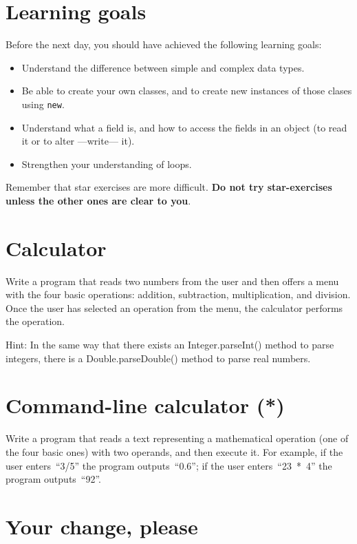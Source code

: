 \documentclass{article}
\begin{document}
\section*{Learning goals}
\label{sec:learning-goals}

Before the next day, you should have achieved the following learning
goals: 

\begin{itemize}
\item Understand the difference between simple and complex data types. 
\item Be able to create your own classes, and to create new instances
  of those clases using \verb+new+.
\item Understand what a field is, and how to access the fields in an
  object (to read it or to alter ---write--- it). 
\item Strengthen your understanding of loops. 
\end{itemize}

Remember that star exercises are more difficult. 
\textbf{Do not try star-exercises unless the other ones are clear to
  you}.  

\section{Calculator}
\label{sec:calculator}

Write a program that reads two numbers from the user and then offers a
menu with the four basic operations: addition, subtraction,
multiplication, and division. Once the user has selected an operation
from the menu, the calculator performs the operation.

Hint: In the same way that there exists an Integer.parseInt() method
to parse integers, there is a Double.parseDouble() method to parse
real numbers. 

\section{Command-line calculator (*)}
\label{sec:comm-line-calc}

Write a program that reads a text representing a mathematical
operation (one of the four basic ones) with two operands, and then
execute it. For example, if the user enters~``3/5'' the program
outputs~``0.6''; if the user enters~``23~*~4'' the program
outputs~``92''.

\section{Your change, please}
\label{sec:your-change-please}
\end{document}
